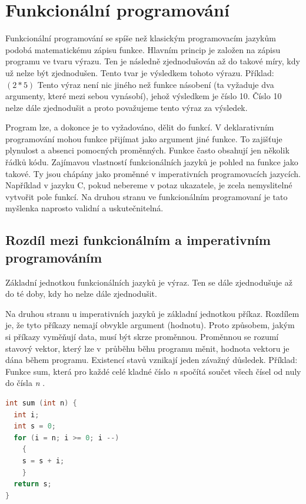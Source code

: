 \documentclass[12pt,a4paper]{report}
\begin{document}
\section{Funkcionální programování}
Funkcionální programování se spíše než klasickým programovacím jazykům podobá matematickému zápisu funkce. Hlavním princip je založen na zápisu programu ve tvaru výrazu. Ten je následně zjednodušován až do takové míry, kdy už nelze být zjednodušen. Tento tvar je výsledkem tohoto výrazu. \newline
Příklad: \newline
$(2 * 5)$ Tento výraz není nic jiného než funkce násobení (ta vyžaduje dva argumenty, které mezi sebou vynásobí), jehož výsledkem je číslo 10. Číslo 10 nelze dále zjednodušit a proto považujeme tento výraz za výsledek. 

Program lze, a dokonce je to vyžadováno, dělit do funkcí. V deklarativním programování mohou funkce přijímat jako argument jiné funkce. To zajišťuje plynulost a absenci pomocných proměnných. Funkce často obsahují jen několik řádků kódu. Zajímavou vlastností funkcionálních jazyků je pohled na funkce jako takové. Ty jsou chápány jako proměnné v imperativních programovacích jazycích. Například v jazyku C, pokud nebereme v potaz ukazatele, je zcela nemyslitelné vytvořit pole funkcí. Na druhou stranu ve funkcionálním programovaní je tato myšlenka naprosto validní a uskutečnitelná.  
\subsection{Rozdíl mezi funkcionálním a imperativním programováním}
Základní jednotkou funkcionálních jazyků je výraz. Ten se dále zjednodušuje až do té doby, kdy ho nelze dále zjednodušit. 

Na druhou stranu u imperativních jazyků je základní jednotkou příkaz. Rozdílem je, že tyto příkazy nemají obvykle argument (hodnotu). Proto způsobem, jakým si příkazy vyměňují data, musí být skrze proměnnou. Proměnnou se rozumí stavový vektor, který lze v~průběhu běhu programu měnit, hodnota vektoru je dána během programu. Existencí stavů vznikají jeden závažný důsledek.
\newline
\newline
Příklad:\newline
Funkce sum, která pro každé celé kladné číslo \textit{n} spočítá součet všech čísel od nuly do čísla \textit{n} .\newline
\begin{lstlisting}[caption={jazyk C}, captionpos=b, language = C]	
int sum (int n) {
  int i;
  int s = 0;
  for (i = n; i >= 0; i --)
    {
    s = s + i;
    }   
  return s;
}
\end{lstlisting}
\end{document}
